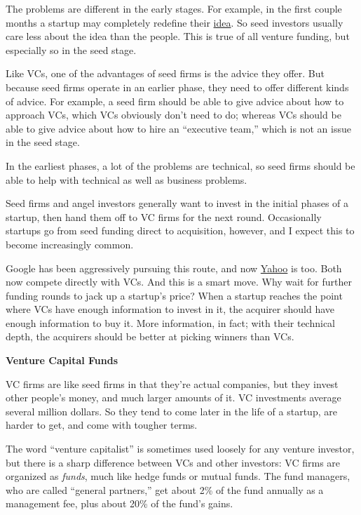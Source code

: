\documentclass[12pt]{book}
\begin{document}
The problems are different in the early stages. For example, in the
first couple months a startup may completely redefine their
\href{ideas.html}{idea}. So seed investors usually care less about the
idea than the people. This is true of all venture funding, but
especially so in the seed stage.

Like VCs, one of the advantages of seed firms is the advice they offer.
But because seed firms operate in an earlier phase, they need to offer
different kinds of advice. For example, a seed firm should be able to
give advice about how to approach VCs, which VCs obviously don't need to
do; whereas VCs should be able to give advice about how to hire an
``executive team,'' which is not an issue in the seed stage.

In the earliest phases, a lot of the problems are technical, so seed
firms should be able to help with technical as well as business
problems.

Seed firms and angel investors generally want to invest in the initial
phases of a startup, then hand them off to VC firms for the next round.
Occasionally startups go from seed funding direct to acquisition,
however, and I expect this to become increasingly common.

Google has been aggressively pursuing this route, and now
\href{http://ycombinator.com/buckman.html}{Yahoo} is too. Both now
compete directly with VCs. And this is a smart move. Why wait for
further funding rounds to jack up a startup's price? When a startup
reaches the point where VCs have enough information to invest in it, the
acquirer should have enough information to buy it. More information, in
fact; with their technical depth, the acquirers should be better at
picking winners than VCs.

\textbf{Venture Capital Funds}

VC firms are like seed firms in that they're actual companies, but they
invest other people's money, and much larger amounts of it. VC
investments average several million dollars. So they tend to come later
in the life of a startup, are harder to get, and come with tougher
terms.

The word ``venture capitalist'' is sometimes used loosely for any
venture investor, but there is a sharp difference between VCs and other
investors: VC firms are organized as \emph{funds}, much like hedge funds
or mutual funds. The fund managers, who are called ``general partners,''
get about 2\% of the fund annually as a management fee, plus about 20\%
of the fund's gains.
\end{document}
